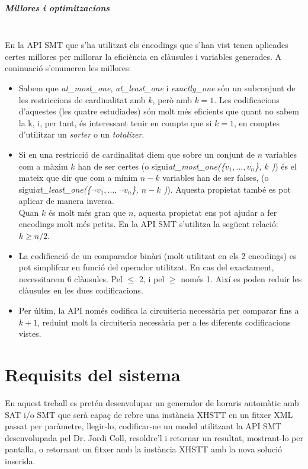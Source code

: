 \documentclass[11pt,a4paper,twoside]{report}
\begin{document}
  \paragraph*{Millores i optimitzacions} ~\\
  En la API SMT que s'ha utilitzat els encodings que s'han vist tenen aplicades certes millores per millorar la eficiència en clàusules i variables generades. A coninuació s'enumeren les millores:

  \begin{itemize}
    \item Sabem que \textit{at\_most\_one}, \textit{at\_least\_one} i \textit{exactly\_one} són
          un subconjunt de les restriccions de cardinalitat amb $k$, però amb $k=1$. Les codificacions d'aquestes (les quatre estudiades) són molt més eficients que quant no sabem la k, i, 
          per tant, és interessant tenir en compte que si $k=1$, en comptes d'utilitzar un \textit{sorter} o un \textit{totalizer}.
    \item Si en una restricció de cardinalitat diem que sobre un conjunt de $n$
          variables com a màxim $k$ han de ser certes (o sigui\textit{at\_most\_one(\{$v_1, ... ,v_n$\}, $k$ )})
          és el mateix que dir que com a mínim $n-k$ variables han de ser falses,
          (o sigui\textit{at\_least\_one(\{$\neg v_1, ... ,\neg v_n$\}, $n-k$ )}). Aquesta propietat també es pot aplicar de manera inversa. \\
          Quan $k$ és molt més gran que $n$, aquesta propietat ens pot ajudar a fer encodings molt més petits. 
          En la API SMT s'utilitza la següent relació: $k \geq n/2$.
    \item La codificació de un comparador binàri (molt utilitzat en els 2 encodings) es pot simplifcar en funció del operador utilitzat. En cas del exactament, necessitarem 6 clàusules. Pel $\leq$ 2, i pel $\geq$ només 1. Així es poden reduir les clàusules en les dues codificacions.
    \item Per últim, la API només codifica la circuiteria necessària per comparar fins a $k+1$, reduint molt la circuiteria necessària per a les diferents codificacions vistes.
  \end{itemize}




  \chapter{Requisits del sistema}

  En aquest treball es pretén desenvolupar un generador de horaris automàtic 
  amb SAT i/o SMT que serà capaç de rebre una instància XHSTT en un fitxer XML passat per paràmetre, 
  llegir-lo, codificar-ne un model utilitzant la API SMT desenvolupada pel Dr. Jordi Coll, resoldre'l i retornar un resultat, mostrant-lo per pantalla, o retornant un fitxer amb la instància XHSTT amb la nova solució inserida.
\end{document}
